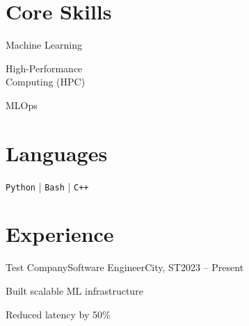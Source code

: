 \begin{paracol}{2}

\section*{Core Skills}
   { \setlength{\baselineskip}{10pt} \setlength{\parskip}{7.5pt} \scshape

    Machine Learning

    High-Performance\\Computing (HPC)

    MLOps

   }

\section*{Languages}

    \texttt{Python} | \texttt{Bash} | \texttt{C++}

\switchcolumn

\section*{Experience}

    \begin{itemizeAcademic}{Test Company}{Software Engineer}{City, ST}{2023 -- Present}

        \itemi Built scalable ML infrastructure

        \itemi Reduced latency by 50\%

    \end{itemizeAcademic}

\end{paracol}
